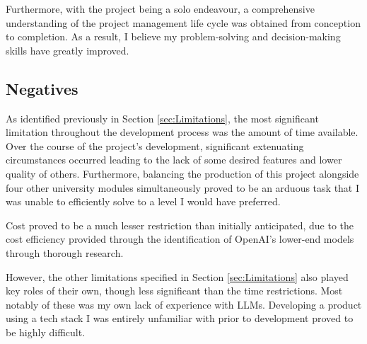 \para Furthermore, with the project being a solo endeavour, a comprehensive understanding of the project management life cycle was 
obtained from conception to completion. As a result, I believe my problem-solving and decision-making skills have greatly improved.   

\subsection{Negatives}
As identified previously in Section \ref{sec:Limitations}, the most significant limitation throughout the development process 
was the amount of time available. Over the course of the project's development, significant extenuating circumstances occurred 
leading to the lack of some desired features and lower quality of others. Furthermore, balancing the production of this project 
alongside four other university modules simultaneously proved to be an arduous task that I was unable to efficiently solve to 
a level I would have preferred.

\para Cost proved to be a much lesser restriction than initially anticipated, due to the cost efficiency 
provided through the identification of OpenAI's lower-end models through thorough research. 

\para However, the other limitations specified in Section \ref{sec:Limitations} also played key roles of their own, though less significant 
than the time restrictions. Most notably of these was my own lack of experience with LLMs. Developing a product using a tech stack 
I was entirely unfamiliar with prior to development proved to be highly difficult.